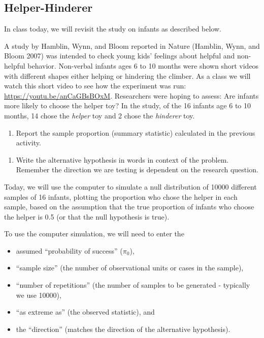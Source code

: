 \documentclass[
]{report}
\providecommand{\tightlist}{%
  \setlength{\itemsep}{0pt}\setlength{\parskip}{0pt}}
\begin{document}
\subsection{Helper-Hinderer}\label{helper-hinderer-1}

In class today, we will revisit the study on infants as described below.

A study by Hamblin, Wynn, and Bloom reported in Nature (Hamblin, Wynn, and Bloom 2007) was intended to check young kids' feelings about helpful and non-helpful behavior. Non-verbal infants ages 6 to 10 months were shown short videos with different shapes either helping or hindering the climber. As a class we will watch this short video to see how the experiment was run: \url{https://youtu.be/anCaGBsBOxM}. Researchers were hoping to assess: Are infants more likely to choose the helper toy? In the study, of the 16 infants age 6 to 10 months, 14 chose the \emph{helper} toy and 2 chose the \emph{hinderer} toy.

\begin{enumerate}
\def\labelenumi{\arabic{enumi}.}
\tightlist
\item
  Report the sample proportion (summary statistic) calculated in the previous activity.
\end{enumerate}

\vspace{0.3in}

\begin{enumerate}
\def\labelenumi{\arabic{enumi}.}
\setcounter{enumi}{1}
\tightlist
\item
  Write the alternative hypothesis in words in context of the problem. Remember the direction we are testing is dependent on the research question.
\end{enumerate}

\vspace{0.8in}

Today, we will use the computer to simulate a null distribution of 10000 different samples of 16 infants, plotting the proportion who chose the helper in each sample, based on the assumption that the true proportion of infants who choose the helper is 0.5 (or that the null hypothesis is true).

\newpage

To use the computer simulation, we will need to enter the

\begin{itemize}
\tightlist
\item
  assumed ``probability of success'' (\(\pi_0\)),
\item
  ``sample size'' (the number of observational units or cases in the sample),
\item
  ``number of repetitions'' (the number of samples to be generated - typically we use 10000),
\item
  ``as extreme as'' (the observed statistic), and
\item
  the ``direction'' (matches the direction of the alternative hypothesis).
\end{itemize}
\end{document}
